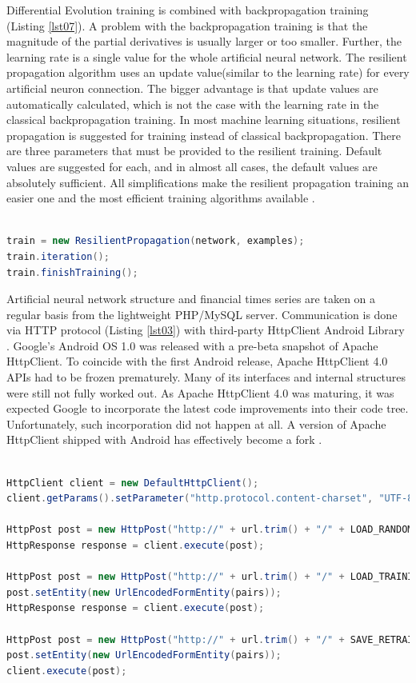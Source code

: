 \documentclass[a4paper,conference]{IEEEtran}
\begin{document}
Differential Evolution training is combined with backpropagation training (Listing \ref{lst07}). A problem with the backpropagation training is that the magnitude of the partial derivatives is usually larger or too smaller. Further, the learning rate is a single value for the whole artificial neural network. The resilient propagation algorithm uses an update value(similar to the learning rate) for every artificial neuron connection. The bigger advantage is that update values are automatically calculated, which is not the case with the learning rate in the classical backpropagation training. In most machine learning situations, resilient propagation is suggested for training instead of classical backpropagation. There are three parameters that must be provided to the resilient training. Default values are suggested for each, and in almost all cases, the default values are absolutely sufficient. All simplifications make the resilient propagation training an easier one and the most efficient training algorithms available \cite{Heaton-01}.

\begin{lstlisting}[caption=Resilient backpropagation training, language=Java, basicstyle=\tiny, label=lst07]

train = new ResilientPropagation(network, examples);
train.iteration();
train.finishTraining();

\end{lstlisting}

Artificial neural network structure and financial times series are taken on a regular basis from the lightweight PHP/MySQL server. Communication is done via HTTP protocol (Listing \ref{lst03}) with third-party HttpClient Android Library \cite{Sebera-01}. Google's Android OS 1.0 was released with a pre-beta snapshot of Apache HttpClient. To coincide with the first Android release, Apache HttpClient 4.0 APIs had to be frozen prematurely. Many of its interfaces and internal structures were still not fully worked out. As Apache HttpClient 4.0 was maturing, it was expected Google to incorporate the latest code improvements into their code tree. Unfortunately, such incorporation did not happen at all. A version of Apache HttpClient shipped with Android has effectively become a fork \cite{Apache-01}.

\begin{lstlisting}[caption=HTTP communication, language=Java, basicstyle=\tiny, label=lst03]

HttpClient client = new DefaultHttpClient();
client.getParams().setParameter("http.protocol.content-charset", "UTF-8");

HttpPost post = new HttpPost("http://" + url.trim() + "/" + LOAD_RANDOM_ANN_SCRIPT);
HttpResponse response = client.execute(post);

HttpPost post = new HttpPost("http://" + url.trim() + "/" + LOAD_TRAINING_SET_SCRIPT);
post.setEntity(new UrlEncodedFormEntity(pairs));
HttpResponse response = client.execute(post);

HttpPost post = new HttpPost("http://" + url.trim() + "/" + SAVE_RETRAINED_ANN_SCRIPT);
post.setEntity(new UrlEncodedFormEntity(pairs));
client.execute(post);

\end{lstlisting}
\end{document}
